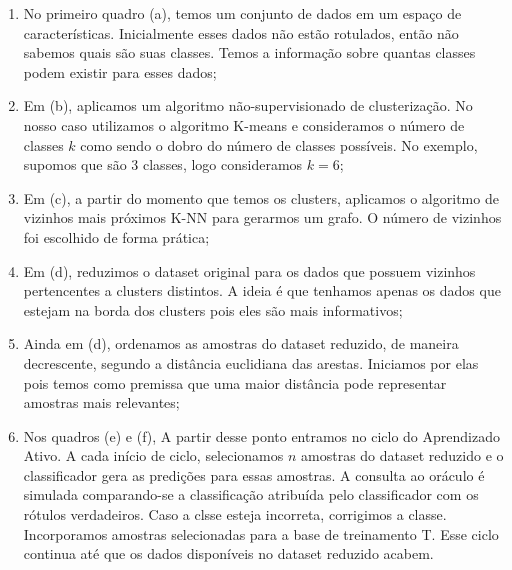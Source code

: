 \begin{enumerate}
  \item No primeiro quadro (a), temos um conjunto de dados em um espaço de características. Inicialmente esses dados não estão rotulados, então não sabemos quais são suas classes. Temos a informação sobre quantas classes podem existir para esses dados;
  
  \item Em (b), aplicamos um algoritmo não-supervisionado de clusterização. No nosso caso utilizamos o algoritmo K-means e consideramos o número de classes $k$ como sendo o dobro do número de classes possíveis. No exemplo, supomos que são 3 classes, logo consideramos $k=6$; 
  
  \item Em (c), a partir do momento que temos os clusters, aplicamos o algoritmo de vizinhos mais próximos K-NN para gerarmos um grafo. O número de vizinhos foi escolhido de forma prática;
  
  \item Em (d), reduzimos o dataset original para os dados que possuem vizinhos pertencentes a clusters distintos. A ideia é que tenhamos apenas os dados que estejam na borda dos clusters pois eles são mais informativos;
  
  \item Ainda em (d), ordenamos as amostras do dataset reduzido, de maneira decrescente, segundo a distância euclidiana das arestas. Iniciamos por elas pois temos como premissa que uma maior distância pode representar amostras mais relevantes;
  
  \item Nos quadros (e) e (f), %
  A partir desse ponto entramos no ciclo do Aprendizado Ativo. A cada início de ciclo, selecionamos $n$ amostras do dataset reduzido e o classificador gera as predições para essas amostras. A consulta ao oráculo é simulada comparando-se a classificação atribuída pelo classificador com os rótulos verdadeiros. Caso a clsse esteja incorreta, corrigimos a classe. Incorporamos amostras selecionadas para a base de treinamento T. Esse ciclo continua até que os dados disponíveis no dataset reduzido acabem. 
\end{enumerate}

